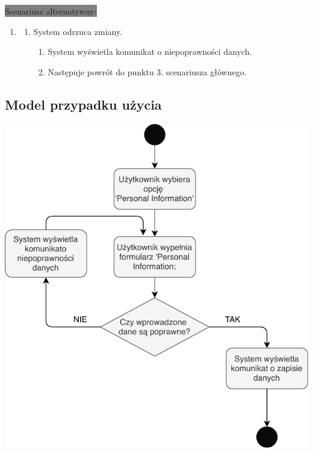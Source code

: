 \documentclass[12pt]{report}
\begin{document}
	\colorbox{grey}{Scenariusz alternatywny:}
	\begin{enumerate}\addtocounter{enumi}{5}
		\item[]
		\begin{enumerate}
			\item System odrzuca zmiany.
			\begin{enumerate}
				\item System wyświetla komunikat o niepoprawności danych.
				\item Następuje powrót do punktu 3. scenariusza głównego.
			\end{enumerate}
		\end{enumerate}
	\end{enumerate}

	\subsection{Model przypadku użycia}
	\begin{center}
		\includegraphics[width=400pt]{edycja.pdf}
	\end{center}
	\newpage
	
\end{document}
